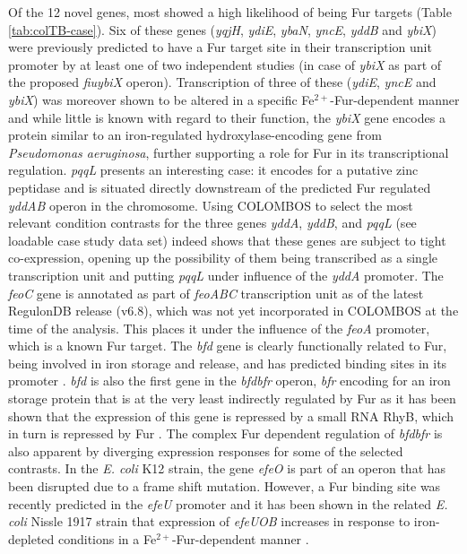 Of the 12 novel genes, most showed a high likelihood of being Fur targets  (Table \ref{tab:colTB-case}). Six of these genes (\textit{yqjH}, \textit{ydiE},  \textit{ybaN}, \textit{yncE}, \textit{yddB} and \textit{ybiX}) were previously  predicted to have a Fur target site in their transcription unit promoter by at  least one of two independent studies \cite{Panina2001, Meysman2011} (in case of  \textit{ybiX} as part of the proposed \textit{fiu}\textunderscore\textit{ybiX}  operon). Transcription of three of these (\textit{ydiE}, \textit{yncE} and  \textit{ybiX}) was moreover shown to be altered in a specific  Fe$^{2+}$-Fur-dependent manner \cite{McHugh2003} and while little is known with  regard to their function, the \textit{ybiX} gene encodes a protein similar to  an iron-regulated hydroxylase-encoding gene from {\it Pseudomonas aeruginosa},  further supporting a role for Fur in its transcriptional regulation.  \textit{pqqL} presents an interesting case: it encodes for a putative zinc  peptidase and is situated directly downstream of the predicted  Fur regulated \textit{yddAB} operon in the chromosome. Using COLOMBOS to select the most relevant  condition contrasts for the three genes \textit{yddA}, \textit{yddB}, and  \textit{pqqL} (see loadable case study data set) indeed shows that these genes  are subject to tight co-expression, opening up the possibility of them being  transcribed as a single transcription unit and putting \textit{pqqL} under  influence of the \textit{yddA} promoter. The \textit{feoC} gene is annotated as  part of \textit{feoABC} transcription unit as of the latest RegulonDB release  (v6.8), which was not yet incorporated in COLOMBOS at the time of the analysis.  This places it under the influence of the \textit{feoA} promoter, which is a  known Fur target. The \textit{bfd} gene is clearly functionally related to Fur,  being involved in iron storage and release, and has predicted binding sites in  its promoter \cite{Chen2007}. \textit{bfd} is also the first gene in the  \textit{bfd}\textunderscore\textit{bfr} operon, \textit{bfr} encoding for an  iron storage protein that is at the very least indirectly regulated by Fur as  it has been shown that the expression of this gene is repressed by a small RNA  RhyB, which in turn is repressed by Fur \cite{Masse2002}. The complex Fur  dependent regulation of \textit{bfd}\textunderscore\textit{bfr} is also  apparent by diverging expression responses for some of the selected contrasts.  In the {\it E. coli} K12 strain, the gene \textit{efeO} is part of an operon  that has been disrupted due to a frame shift mutation. However, a Fur binding  site was recently predicted in the \textit{efeU} promoter \cite{Meysman2011}  and it has been shown in the related {\it E. coli} Nissle 1917 strain that  expression of \textit{efeUOB} increases in response to iron-depleted conditions  in a Fe$^{2+}$-Fur-dependent manner \cite{Grosse2006}.

